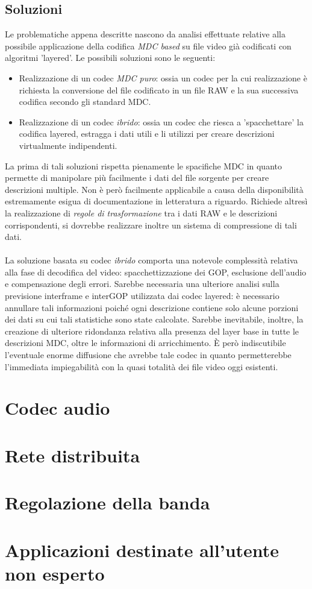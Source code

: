 \subsection{Soluzioni}

Le problematiche appena descritte nascono da analisi effettuate relative alla
possibile applicazione della codifica \emph{MDC based} su file video già
codificati con algoritmi 'layered'. Le possibili soluzioni sono le seguenti:

\begin{itemize}
  \item Realizzazione di un codec \emph{MDC puro}: ossia un codec per la cui
  realizzazione è richiesta la conversione del file codificato in un file RAW e
  la sua successiva codifica secondo gli standard MDC.
  \item Realizzazione di un codec \emph{ibrido}: ossia un codec che riesca a
  'spacchettare' la codifica layered, estragga i dati utili e li utilizzi per
  creare descrizioni virtualmente indipendenti.
\end{itemize}

La prima di tali soluzioni rispetta pienamente le spacifiche MDC in quanto
permette di manipolare più facilmente i dati del file sorgente per creare
descrizioni multiple. Non è però facilmente applicabile a causa della
disponibilità estremamente esigua di documentazione in letteratura a riguardo. Richiede
altresì la realizzazione di \emph{regole di trasformazione} tra i dati RAW e le
descrizioni corrispondenti, si dovrebbe realizzare inoltre un sistema di
compressione di tali dati.
\\\\
La soluzione basata su codec \emph{ibrido} comporta una notevole complessità
relativa alla fase di decodifica del video: spacchettizzazione dei GOP,
esclusione dell'audio e compensazione degli errori. Sarebbe necessaria una
ulteriore analisi sulla previsione interframe e interGOP utilizzata dai codec
layered: è necessario annullare tali informazioni poiché ogni descrizione
contiene solo alcune porzioni dei dati su cui tali statistiche sono state calcolate.
Sarebbe inevitabile, inoltre, la creazione di ulteriore ridondanza relativa
alla presenza del layer base in tutte le descrizioni MDC, oltre le informazioni
di arricchimento. \`E però indiscutibile l'eventuale enorme diffusione che avrebbe
tale codec in quanto permetterebbe l'immediata impiegabilità con la quasi totalità dei file video oggi esistenti.

\section{Codec audio}

\section{Rete distribuita}

\section{Regolazione della banda}

\section{Applicazioni destinate all'utente non esperto}